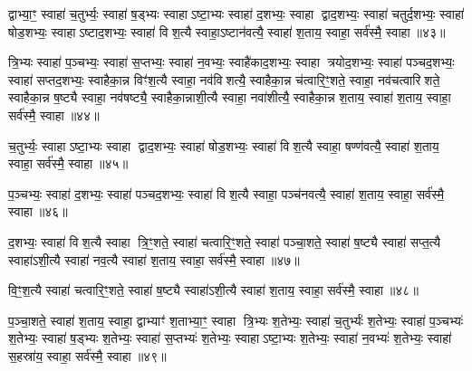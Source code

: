 {\anuvakamend[{एक॑स्मै त्रि॒भ्यः प॑ञ्चा॒शत्॥12॥}]}

द्वाभ्या॒ꣳ॒ स्वाहा॑ च॒तुर्भ्यः॒ स्वाहा॑ ष॒ड्भ्यः स्वाहाऽष्टा॒भ्यः स्वाहा॑ द॒शभ्यः॒ स्वाहा द्वाद॒शभ्यः॒ स्वाहा॑ चतुर्द॒शभ्यः॒ स्वाहा॑ षोड॒शभ्यः॒ स्वाहाऽष्टाद॒शभ्यः॒ स्वाहा॑ विश॒त्यै स्वाहा॒ऽष्टान॑वत्यै॒ स्वाहा॑ श॒ताय॒ स्वाहा॒ सर्व॑स्मै॒ स्वाहा॥४३॥

{\anuvakamend[{द्वाभ्या॑म॒ष्टान॑वत्यै॒ षड्विꣳ॑शतिः॥13॥}]}

त्रि॒भ्यः स्वाहा॑ प॒ञ्चभ्यः॒ स्वाहा॑ स॒प्तभ्यः॒ स्वाहा॑ न॒वभ्यः॒ स्वाहै॑काद॒शभ्यः॒ स्वाहा त्रयोद॒शभ्यः॒ स्वाहा॑ पञ्चद॒शभ्यः॒ स्वाहा॑ सप्तद॒शभ्यः॒ स्वाहैका॒न्न विꣳ॑श॒त्यै स्वाहा॒ नव॑विशत्यै॒ स्वाहैका॒न्न च॑त्वारि॒ꣳ॒शते॒ स्वाहा॒ नव॑चत्वारिशते॒ स्वाहैका॒न्न ष॒ष्ट्यै स्वाहा॒ नव॑षष्ट्यै॒ स्वाहैका॒न्नाशी॒त्यै स्वाहा॒ नवा॑शीत्यै॒ स्वाहैका॒न्न श॒ताय॒ स्वाहा॑ श॒ताय॒ स्वाहा॒ सर्व॑स्मै॒ स्वाहा॥४४॥

{\anuvakamend[{त्रि॒भ्योऽष्टाचत्वारि॒ꣳ॒शत्॥14॥}]}

च॒तुर्भ्यः॒ स्वाहाऽष्टा॒भ्यः स्वाहा द्वाद॒शभ्यः॒ स्वाहा॑ षोड॒शभ्यः॒ स्वाहा॑ विश॒त्यै स्वाहा॒ षण्ण॑वत्यै॒ स्वाहा॑ श॒ताय॒ स्वाहा॒ सर्व॑स्मै॒ स्वाहा॥४५॥

{\anuvakamend[{च॒तुर्भ्यः॒ षण्ण॑वत्यै॒ षोड॑श॥15॥}]}

प॒ञ्चभ्यः॒ स्वाहा॑ द॒शभ्यः॒ स्वाहा॑ पञ्चद॒शभ्यः॒ स्वाहा॑ विश॒त्यै स्वाहा॒ पञ्च॑नवत्यै॒ स्वाहा॑ श॒ताय॒ स्वाहा॒ सर्व॑स्मै॒ स्वाहा॥४६॥

{\anuvakamend[{प॒ञ्चभ्यः॒ प़ञ्च॑नवत्यै॒ चतु॑र्दश॥16॥}]}

द॒शभ्यः॒ स्वाहा॑ विश॒त्यै स्वाहा त्रि॒ꣳ॒शते॒ स्वाहा॑ चत्वारि॒ꣳ॒शते॒ स्वाहा॑ पञ्चा॒शते॒ स्वाहा॑ ष॒ष्ट्यै स्वाहा॑ सप्त॒त्यै स्वाहा॑ऽशी॒त्यै स्वाहा॑ नव॒त्यै स्वाहा॑ श॒ताय॒ स्वाहा॒ सर्व॑स्मै॒ स्वाहा॥४७॥

{\anuvakamend[{द॒शभ्यो॒ द्वाविꣳ॑शतिः॥17॥}]}

वि॒ꣳ॒श॒त्यै स्वाहा॑ चत्वारि॒ꣳ॒शते॒ स्वाहा॑ ष॒ष्ट्यै स्वाहा॑ऽशी॒त्यै स्वाहा॑ श॒ताय॒ स्वाहा॒ सर्व॑स्मै॒ स्वाहा॥४८॥

{\anuvakamend[{वि॒ꣳ॒श॒त्यै द्वाद॑श॥18॥}]}

प॒ञ्चा॒शते॒ स्वाहा॑ श॒ताय॒ स्वाहा॒ द्वाभ्याꣳ॑ श॒ताभ्या॒ꣳ॒ स्वाहा त्रि॒भ्यः श॒तेभ्यः॒ स्वाहा॑ च॒तुर्भ्यः॑ श॒तेभ्यः॒ स्वाहा॑ प॒ञ्चभ्यः॑ श॒तेभ्यः॒ स्वाहा॑ ष॒ड्भ्यः श॒तेभ्यः॒ स्वाहा॑ स॒प्तभ्यः॑ श॒तेभ्यः॒ स्वाहाऽष्टा॒भ्यः श॒तेभ्यः॒ स्वाहा॑ न॒वभ्यः॑ श॒तेभ्यः॒ स्वाहा॑ स॒हस्रा॑य॒ स्वाहा॒ सर्व॑स्मै॒ स्वाहा॥४९॥

